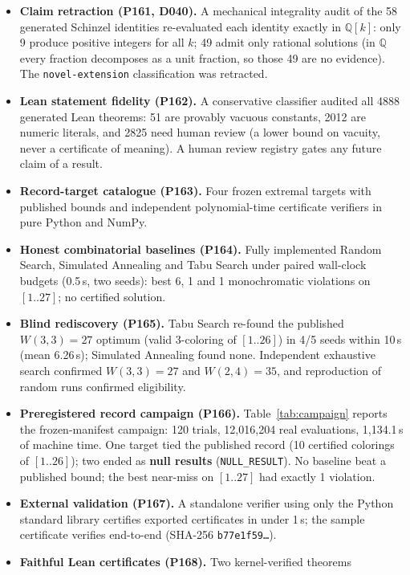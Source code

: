 \documentclass[11pt,a4paper]{article}
\begin{document}
\begin{itemize}
    \item \textbf{Claim retraction (P161, D040).} A mechanical integrality audit of the 58
    generated Schinzel identities re-evaluated each identity exactly in $\mathbb{Q}[k]$:
    only 9 produce positive integers for all $k$; 49 admit only rational solutions
    (in $\mathbb{Q}$ every fraction decomposes as a unit fraction, so those 49 are no
    evidence). The \texttt{novel-extension} classification was retracted.
    \item \textbf{Lean statement fidelity (P162).} A conservative classifier audited all 4888
    generated Lean theorems: 51 are provably vacuous constants, 2012 are numeric literals,
    and 2825 need human review (a lower bound on vacuity, never a certificate of meaning).
    A human review registry gates any future claim of a result.
    \item \textbf{Record-target catalogue (P163).} Four frozen extremal targets with
    published bounds and independent polynomial-time certificate verifiers in pure Python
    and NumPy.
    \item \textbf{Honest combinatorial baselines (P164).} Fully implemented Random Search,
    Simulated Annealing and Tabu Search under paired wall-clock budgets     (0.5\,s, two seeds):
    best 6, 1 and 1 monochromatic violations on $[1..27]$; no certified solution.
    \item \textbf{Blind rediscovery (P165).} Tabu Search re-found the published
    $W(3,3) = 27$ optimum (valid 3-coloring of $[1..26]$) in 4/5 seeds within 10\,s
    (mean 6.26\,s); Simulated Annealing found none. Independent exhaustive search confirmed
    $W(3,3) = 27$ and $W(2,4) = 35$, and reproduction of random runs confirmed eligibility.
    \item \textbf{Preregistered record campaign (P166).} Table~\ref{tab:campaign} reports the
    frozen-manifest campaign: 120 trials, 12{,}016{,}204 real evaluations, 1{,}134.1\,s of
    machine time. One target tied the published record (10 certified colorings of
    $[1..26]$); two ended as \textbf{null results} (\texttt{NULL\_RESULT}). No baseline beat a
    published bound; the best near-miss on $[1..27]$ had exactly 1 violation.
    \item \textbf{External validation (P167).} A standalone verifier using only the Python
    standard library certifies exported certificates in under 1\,s; the sample certificate
    verifies end-to-end (SHA-256 \texttt{b77e1f59\ldots}).
    \item \textbf{Faithful Lean certificates (P168).} Two kernel-verified theorems

\end{itemize}
\end{document}
